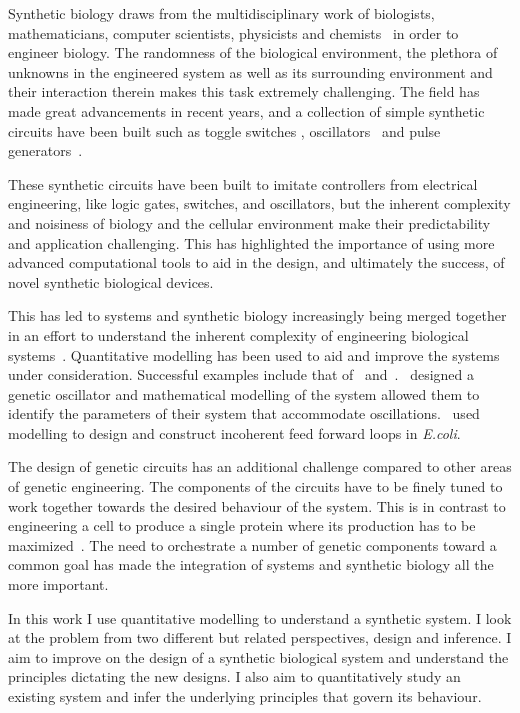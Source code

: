 Synthetic biology draws from the multidisciplinary work of biologists, mathematicians, computer scientists, physicists and chemists~\autocite{Vinson:2011hu} in order to engineer biology. The randomness of the biological environment, the plethora of unknowns in the engineered system as well as its surrounding environment and their interaction therein makes this task extremely challenging. The field has made great advancements in recent years, and a collection of simple synthetic circuits have been built such as toggle switches \autocite{Gardner:2000vha, Kramer:2004kq, Isaacs:2003hta, Ham:2008hh, Deans:2007cy, Friedland:2009ce}, oscillators~\autocite{Stricker:2008jqa, Fung:2005jd, Tigges:2009jx} and pulse generators~\autocite{Basu:2004gn}.  

These synthetic circuits have been built to imitate controllers from electrical engineering, like logic gates, switches, and oscillators, but the inherent complexity and noisiness of biology and the cellular environment make their predictability and application challenging. This has highlighted the importance of using more advanced computational tools to aid in the design, and ultimately the success, of novel synthetic biological devices. 

This has led to systems and synthetic biology increasingly being merged together in an effort to understand the inherent complexity of engineering biological systems~\autocite{Gramelsberger:2013iu}. Quantitative modelling has been used to aid and improve the systems under consideration. Successful examples include that of~\textcite{Stricker:2008jqa} and~\textcite{Entus:wy}.~\textcite{Stricker:2008jqa}  designed a genetic oscillator and mathematical modelling of the system allowed them to identify the parameters of their system that accommodate oscillations.~\textcite{Entus:wy} used modelling to design and construct incoherent feed forward loops in \textit{E.coli}.   

The design of genetic circuits has an additional challenge compared to other areas of genetic engineering. The components of the circuits have to be finely tuned to work together towards the desired behaviour of the system. This is in contrast to engineering a cell to produce a single protein where its production has to be maximized~\autocite{Nielsen:2013hs}. The need to orchestrate a number of genetic components toward a common goal has made the integration of systems and synthetic biology all the more important.


In this work I use quantitative modelling to understand a synthetic system. I look at the problem from two different but related perspectives, design and inference. I aim to improve on the design of a synthetic biological system and understand the principles dictating the new designs. I also aim to quantitatively study an existing system and infer the underlying principles that govern its behaviour. 



